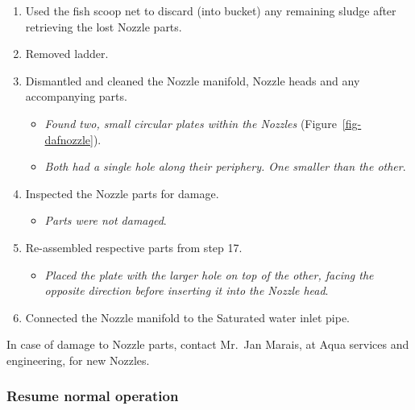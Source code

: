 \documentclass[
  letterpaper,
  DIV=11,
  numbers=noendperiod]{scrreprt}
\providecommand{\tightlist}{%
  \setlength{\itemsep}{0pt}\setlength{\parskip}{0pt}}\usepackage{longtable,booktabs,array}
\begin{document}
\begin{enumerate}
  \begin{itemize}
  \tightlist
  \item
    \emph{Used Fish scoop net and bucket}.
  \item
    \emph{Had to scoop out some sludge first to get to the lost parts}.
  \end{itemize}
\item
  Used the fish scoop net to discard (into bucket) any remaining sludge
  after retrieving the lost Nozzle parts.
\item
  Removed ladder.
\item
  Dismantled and cleaned the Nozzle manifold, Nozzle heads and any
  accompanying parts.

  \begin{itemize}
  \tightlist
  \item
    \emph{Found two, small circular plates within the Nozzles}
    (Figure~\ref{fig-dafnozzle}).
  \item
    \emph{Both had a single hole along their periphery. One smaller than
    the other}.
  \end{itemize}
\item
  Inspected the Nozzle parts for damage.

  \begin{itemize}
  \tightlist
  \item
    \emph{Parts were not damaged}.
  \end{itemize}
\item
  Re-assembled respective parts from step 17.

  \begin{itemize}
  \tightlist
  \item
    \emph{Placed the plate with the larger hole on top of the other,
    facing the opposite direction before inserting it into the Nozzle
    head}.
  \end{itemize}
\item
  Connected the Nozzle manifold to the Saturated water inlet pipe.
\end{enumerate}

{In case of damage to Nozzle parts, contact Mr.~Jan Marais, at Aqua
services and engineering, for new Nozzles}.

\hypertarget{resume-normal-operation-1}{%
\subsubsection{Resume normal
operation}\label{resume-normal-operation-1}}
\end{document}

